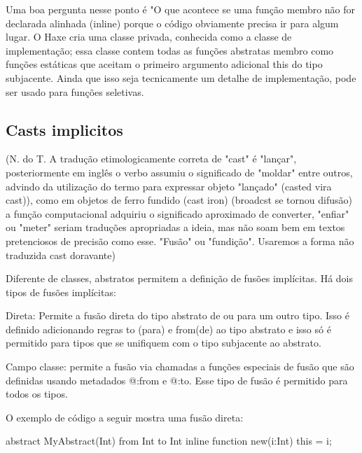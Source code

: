 {{{{{Uma boa pergunta nesse ponto é "O que acontece se uma função membro não for declarada alinhada (inline) porque o código obviamente precisa ir para algum lugar. O Haxe cria uma classe privada, conhecida como a classe de implementação; essa classe contem todas as funções abstratas membro como funções estáticas que aceitam o primeiro argumento adicional this do tipo subjacente. Ainda que isso seja tecnicamente um detalhe de implementação, pode ser usado para funções seletivas.


\subsection{Casts implicitos}

(N. do T. A tradução etimologicamente correta de "cast" é "lançar", posteriormente em inglês o verbo assumiu o significado de "moldar" entre outros, advindo da utilização do termo para expressar objeto "lançado" (casted vira cast)), como em objetos de ferro fundido (cast iron) (broadcst se tornou difusão) a função computacional adquiriu o significado aproximado de converter, "enfiar" ou "meter" seriam traduções apropriadas a ideia, mas não soam bem em textos pretenciosos de precisão como esse. "Fusão" ou "fundição". Usaremos a forma não traduzida cast doravante)


Diferente de classes, abstratos permitem a definição de fusões implícitas. Há dois tipos de fusões implícitas:

Direta: Permite a fusão direta do tipo abstrato de ou para um outro tipo. Isso é definido adicionando regras to (para) e from(de) ao tipo abstrato e isso só é permitido  para tipos que se unifiquem com o tipo subjacente ao abstrato.

Campo classe: permite a fusão via chamadas a funções especiais de fusão que são definidas usando metadados @:from e @:to. Esse tipo de fusão é permitido para todos os tipos.

O exemplo de código a seguir mostra uma fusão direta:

abstract MyAbstract(Int) from Int to Int {
    inline function new(i:Int) {
        this = i;
    }
}

}}}}}
